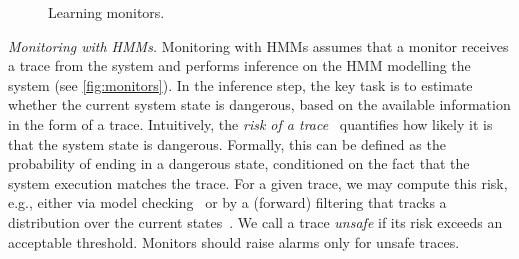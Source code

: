 \documentclass[runningheads]{llncs}
\renewcommand{\paragraph}[1]{\smallskip\noindent\emph{#1}}
\begin{document}
\begin{figure}[t]
\begin{minipage}{.47\textwidth}
{}
        \vspace{-2.5mm}
        \caption{Learning monitors.}
        \label{fig:learning}
    \end{minipage}
\end{figure}

\paragraph{Monitoring with HMMs.} Monitoring with HMMs assumes that a monitor receives a trace from the system and performs inference on the HMM modelling the system (see \cref{fig:monitors}). In the inference step, the key task is to estimate whether the current system state is dangerous, based on the available information in the form of a trace. Intuitively, the \emph{risk of a trace}~\cite{jungesRuntimeMonitorsMarkov2021} quantifies how likely it is that the system state is dangerous. Formally, this can be defined as the probability of ending in a dangerous state, conditioned on the fact that the system execution matches the trace. For a given trace, we may compute this risk, e.g., either via model checking~\cite{baierComputingConditionalProbabilities2014} or by a (forward) filtering that tracks a distribution over the current states~\cite{jungesRuntimeMonitorsMarkov2021,rabinerTutorialHiddenMarkov1989}. We call a trace \emph{unsafe} if its risk exceeds an acceptable threshold. Monitors should raise alarms only for unsafe traces.
\end{document}
